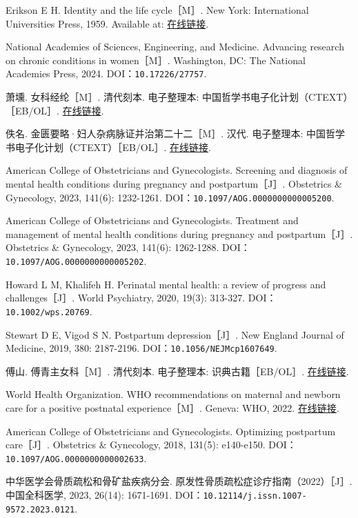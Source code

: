 \begin{enumerate}[label={[Q\arabic*]},leftmargin=*]
  \item Erikson E H. Identity and the life cycle［M］. New York: International Universities Press, 1959. Available at: \href{https://archive.org/details/psychologicaliss0001erik}{在线链接}.
  \item National Academies of Sciences, Engineering, and Medicine. Advancing research on chronic conditions in women［M］. Washington, DC: The National Academies Press, 2024. DOI：\nolinkurl{10.17226/27757}.
  \item 萧壎. 女科经纶［M］. 清代刻本. 电子整理本: 中国哲学书电子化计划（CTEXT）［EB/OL］. \href{https://zh.wikisource.org/zh-hans/女科經綸/序}{在线链接}.
  \item 佚名. 金匮要略·妇人杂病脉证并治第二十二［M］. 汉代. 电子整理本: 中国哲学书电子化计划（CTEXT）［EB/OL］. \href{https://ctext.org/jinkui-yaolue/22/zh}{在线链接}.
  \item American College of Obstetricians and Gynecologists. Screening and diagnosis of mental health conditions during pregnancy and postpartum［J］. Obstetrics \& Gynecology, 2023, 141(6): 1232-1261. DOI：\nolinkurl{10.1097/AOG.0000000000005200}.
  \item American College of Obstetricians and Gynecologists. Treatment and management of mental health conditions during pregnancy and postpartum［J］. Obstetrics \& Gynecology, 2023, 141(6): 1262-1288. DOI：\nolinkurl{10.1097/AOG.0000000000005202}.
  \item Howard L M, Khalifeh H. Perinatal mental health: a review of progress and challenges［J］. World Psychiatry, 2020, 19(3): 313-327. DOI：\nolinkurl{10.1002/wps.20769}.
  \item Stewart D E, Vigod S N. Postpartum depression［J］. New England Journal of Medicine, 2019, 380: 2187-2196. DOI：\nolinkurl{10.1056/NEJMcp1607649}.
  \item 傅山. 傅青主女科［M］. 清代刻本. 电子整理本: 识典古籍［EB/OL］. \href{https://www.shidianguji.com/book/YCM294300096/chapter/1l9ggh6dkjmer}{在线链接}.
  \item World Health Organization. WHO recommendations on maternal and newborn care for a positive postnatal experience［M］. Geneva: WHO, 2022. \href{https://www.who.int/publications/i/item/9789240045989}{在线链接}.
  \item American College of Obstetricians and Gynecologists. Optimizing postpartum care［J］. Obstetrics \& Gynecology, 2018, 131(5): e140-e150. DOI：\nolinkurl{10.1097/AOG.0000000000002633}.
  \item 中华医学会骨质疏松和骨矿盐疾病分会. 原发性骨质疏松症诊疗指南（2022）［J］. 中国全科医学, 2023, 26(14): 1671-1691. DOI：\nolinkurl{10.12114/j.issn.1007-9572.2023.0121}.

\end{enumerate}

